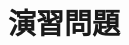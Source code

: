 \documentclass[fleqn]{jsarticle}
\begin{document}

\section{演習問題} \label{sec:exercise}
%





\end{document}
